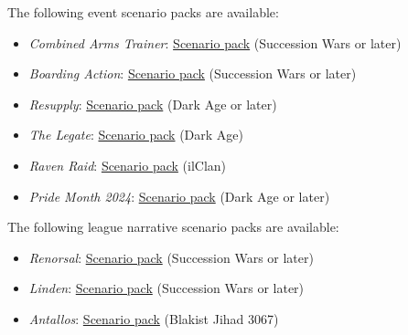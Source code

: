 The following event scenario packs are available:

\begin{itemize}

  \item \emph{Combined Arms Trainer}: \href{https://raw.githubusercontent.com/Eudicods/outworlds-wastes/rules-pdf/combined-arms-trainer.pdf}{Scenario pack} (Succession Wars or later)

  \item \emph{Boarding Action}: \href{https://raw.githubusercontent.com/Eudicods/outworlds-wastes/rules-pdf/boarding-action.pdf}{Scenario pack} (Succession Wars or later)

  \item \emph{Resupply}: \href{https://raw.githubusercontent.com/Eudicods/outworlds-wastes/rules-pdf/resupply.pdf}{Scenario pack} (Dark Age or later)

  \item \emph{The Legate}: \href{https://raw.githubusercontent.com/Eudicods/outworlds-wastes/rules-pdf/the-legate.pdf}{Scenario pack} (Dark Age)

  \item \emph{Raven Raid}: \href{https://raw.githubusercontent.com/Eudicods/outworlds-wastes/rules-pdf/raven-raid.pdf}{Scenario pack} (ilClan)

  \item \emph{Pride Month 2024}: \href{https://raw.githubusercontent.com/Eudicods/outworlds-wastes/rules-pdf/pride-2024.pdf}{Scenario pack} (Dark Age or later)

\end{itemize}

The following league narrative scenario packs are available:

\begin{itemize}

  \item \emph{Renorsal}: \href{https://raw.githubusercontent.com/Eudicods/outworlds-wastes/rules-pdf/renorsal.pdf}{Scenario pack} (Succession Wars or later)

  \item \emph{Linden}: \href{https://raw.githubusercontent.com/Eudicods/outworlds-wastes/rules-pdf/linden.pdf}{Scenario pack} (Succession Wars or later)

  \item \emph{Antallos}: \href{https://raw.githubusercontent.com/Eudicods/outworlds-wastes/rules-pdf/antallos.pdf}{Scenario pack} (Blakist Jihad 3067)

\end{itemize}


